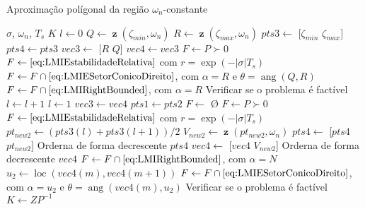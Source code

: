 \documentclass[aspectratio=169,11pt,t,xcolor={usenames,dvipsnames,x11names}]{beamer}
\DeclareMathOperator{\angulo}{ang}
\DeclareMathOperator{\loc}{loc}
\DeclareMathOperator{\z}{\textbf{z}}
\begin{document}
\begin{frame}[c, allowframebreaks]{Aproximação polígonal da região $\omega_n$-constante}
	  \begin{algorithmic}[1]
    \Require $\sigma$, $\omega_n$, $T_s$
    \Ensure $K$
    \State $l \gets 0$
    \State $Q \gets \z(\zeta_{min},\omega_n)$
    \State $R \gets \z(\zeta_{max},\omega_n)$
    \State $pts3 \gets$ [$\zeta_{min}$ $\zeta_{max}$]
    \State $pts4 \gets pts3$
    \State $vec3 \gets$ [$R$ $Q$]
    \State $vec4 \gets vec3$
    \State $F \gets P \succ 0$
    \State $F \gets \eqref{eq:LMIEstabilidadeRelativa}$ com $r = \exp{\left(-|\sigma|T_s\right)}$ 
    \State $F \gets F \cap \eqref{eq:LMIESetorConicoDireito}$, com $\alpha = R$ e $\theta = \angulo(Q,R)$ 
    \State $F \gets F \cap \eqref{eq:LMIRightBounded}$, com $\alpha = R$ 
    \State Verificar se o problema é factível
        \State $l \gets l + 1$
      \Else
        \State $l \gets 1$
        \State $vec3 \gets vec4$
        \State $pts1 \gets pts2$
      \EndIf
        \State $F \gets$ \O {}
        \State $F \gets P \succ 0$
        \State $F \gets \eqref{eq:LMIEstabilidadeRelativa}$ com $r = \exp{\left(-|\sigma|T_s\right)}$ 
        \State $pt_{new2} \gets (pts3(l)+pts3(l+1))/2$
        \State $V_{new2} \gets \z(pt_{new2}, \omega_n)$
        \State $pts4 \gets$ [$pts4$ $pt_{new2}$]
        \State Orderna de forma decrescente $pts4$
        \State $vec4 \gets$ [$vec4$ $V_{new2}$]
        \State Orderna de forma decrescente $vec4$
        \State $F \gets F \cap \eqref{eq:LMIRightBounded}$, com $\alpha = N$ 
          \State $u_2 \gets \loc(vec4(m),vec4(m+1))$
          \State $F \gets F \cap \eqref{eq:LMIESetorConicoDireito}$, com $\alpha = u_2$ e $\theta = \angulo(vec4(m),u_2)$
        \EndFor
        \State Verificar se o problema é factível
    \EndWhile
    \State $K \gets ZP^{-1}$
  \end{algorithmic}
\end{frame}

\begin{frame}[b]
	\begin{figure}
		\centering
		
		
	\end{figure}
\end{frame}
\end{document}
